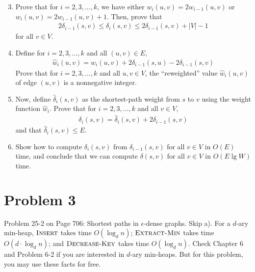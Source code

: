 \documentclass{../../class}
\begin{document}
\begin{enumerate}
    \setcounter{enumi}{2}
    \item Prove that for $i = 2, 3, \dots, k$, we have either $w_i(u, v) = 2w_{i-1}(u, v)$ or $w_i(u, v) = 2w_{i-1}(u, v) + 1$. Then, prove that
    \begin{gather*}
        2\delta_{i-1}(s, v) \leq \delta_i(s, v) \leq 2\delta_{i-1}(s, v) + |V| - 1
    \end{gather*}
    for all $v\in V$.
    \item Define for $i = 2, 3, \dots, k$ and all $(u, v)\in E$,
    \begin{gather*}
        \hat{w}_i(u, v) = w_i(u, v) + 2\delta_{i-1}(s, u) - 2\delta_{i-1}(s, v)
    \end{gather*}
    Prove that for $i = 2, 3, \dots, k$ and all $u, v\in V$, the \enquote{reweighted} value $\hat{w}_i(u, v)$ of edge $(u, v)$ is a nonnegative integer.
    \item Now, define $\hat{\delta}_i(s, v)$ as the shortest-path weight from $s$ to $v$ using the weight function $\hat{w}_i$. Prove that for $i = 2, 3, \dots, k$ and all $v\in V$,
    \begin{gather*}
        \delta_i(s, v) = \hat{\delta}_i(s, v) + 2\delta_{i-1}(s, v)
    \end{gather*}
    and that $\hat{\delta}_i(s, v) \leq E$.
    \item Show how to compute $\delta_i(s, v)$ from $\delta_{i-1}(s, v)$ for all $v\in V$ in $O(E)$ time, and conclude that we can compute $\delta(s, v)$ for all $v\in V$ in $O(E\lg{W})$ time.
\end{enumerate}

\newpage
\section*{Problem 3}
\begin{tcolorbox}
    Problem 25-2 on Page 706: Shortest paths in $\epsilon$-dense graphs. Skip a). For a $d$-ary min-heap, $\textsc{Insert}$ takes time $O(\log_d{n})$; $\textsc{Extract-Min}$ takes time $O(d\cdot \log_d{n})$; and $\textsc{Decrease-Key}$ takes time $O(\log_d{n})$. Check Chapter 6 and Problem 6-2 if you are interested in $d$-ary min-heaps. But for this problem, you may use these facts for free.
\end{tcolorbox}
\end{document}
